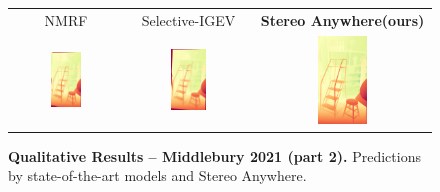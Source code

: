 \documentclass[10pt,twocolumn,letterpaper]{article}
\newcommand{\method}[0]{Stereo Anywhere\xspace}
\begin{document}
\begin{figure}[h]
\begin{tabular}{ccc}
        \small NMRF \cite{guan2024neural} &
        \small Selective-IGEV \cite{wang2024selective} &
        \textbf{\method (ours)} \\
        \includegraphics[width=0.3\textwidth]{imgs/midd21/stereo/NMRF/11.jpg} &
        \includegraphics[width=0.3\textwidth]{imgs/midd21/stereo/Selective/11.jpg} &
        \includegraphics[width=0.3\textwidth]{imgs/midd21/stereo/Ours/11.jpg} \\
    \end{tabular}\vspace{-0.3cm}
    \caption{\textbf{Qualitative Results -- Middlebury 2021 (part 2).} Predictions by state-of-the-art models and \method.}
    \label{fig:qual_midd21_2}\vspace{-0.3cm}
\end{figure}
\end{document}
